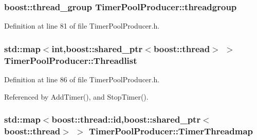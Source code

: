 \hypertarget{classTimerPoolProducer_a1c409ced920df021ed0d05965a42283d}{
\subsubsection[{threadgroup}]{\setlength{\rightskip}{0pt plus 5cm}boost\-::thread\-\_\-group {\bf \-Timer\-Pool\-Producer\-::threadgroup}}}\label{classTimerPoolProducer_a1c409ced920df021ed0d05965a42283d}


\-Definition at line 81 of file \-Timer\-Pool\-Producer.\-h.

\hypertarget{classTimerPoolProducer_a2c4d13b344f41f350c195a113ed59d7a}{
\subsubsection[{\-Threadlist}]{\setlength{\rightskip}{0pt plus 5cm}std\-::map$<$int,boost\-::shared\-\_\-ptr$<$boost\-::thread$>$ $>$ {\bf \-Timer\-Pool\-Producer\-::\-Threadlist}}}\label{classTimerPoolProducer_a2c4d13b344f41f350c195a113ed59d7a}


\-Definition at line 86 of file \-Timer\-Pool\-Producer.\-h.



\-Referenced by \-Add\-Timer(), and \-Stop\-Timer().

\hypertarget{classTimerPoolProducer_a5d112fbb99940e2e38d94ece39878cbd}{
\subsubsection[{\-Timer\-Threadmap}]{\setlength{\rightskip}{0pt plus 5cm}std\-::map$<$boost\-::thread\-::id,boost\-::shared\-\_\-ptr$<$boost\-::thread$>$ $>$ {\bf \-Timer\-Pool\-Producer\-::\-Timer\-Threadmap}}}\label{classTimerPoolProducer_a5d112fbb99940e2e38d94ece39878cbd}


